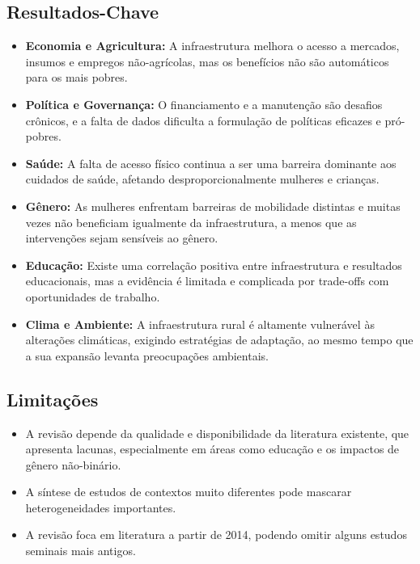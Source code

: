 \documentclass[12pt]{article}
\begin{document}
\subsection*{Resultados-Chave}
\begin{itemize}
    \item \textbf{Economia e Agricultura:} A infraestrutura melhora o acesso a mercados, insumos e empregos não-agrícolas, mas os benefícios não são automáticos para os mais pobres.
    \item \textbf{Política e Governança:} O financiamento e a manutenção são desafios crônicos, e a falta de dados dificulta a formulação de políticas eficazes e pró-pobres.
    \item \textbf{Saúde:} A falta de acesso físico continua a ser uma barreira dominante aos cuidados de saúde, afetando desproporcionalmente mulheres e crianças.
    \item \textbf{Gênero:} As mulheres enfrentam barreiras de mobilidade distintas e muitas vezes não beneficiam igualmente da infraestrutura, a menos que as intervenções sejam sensíveis ao gênero.
    \item \textbf{Educação:} Existe uma correlação positiva entre infraestrutura e resultados educacionais, mas a evidência é limitada e complicada por trade-offs com oportunidades de trabalho.
    \item \textbf{Clima e Ambiente:} A infraestrutura rural é altamente vulnerável às alterações climáticas, exigindo estratégias de adaptação, ao mesmo tempo que a sua expansão levanta preocupações ambientais.
\end{itemize}

\subsection*{Limitações}
\begin{itemize}
    \item A revisão depende da qualidade e disponibilidade da literatura existente, que apresenta lacunas, especialmente em áreas como educação e os impactos de gênero não-binário.
    \item A síntese de estudos de contextos muito diferentes pode mascarar heterogeneidades importantes.
    \item A revisão foca em literatura a partir de 2014, podendo omitir alguns estudos seminais mais antigos.
\end{itemize}
\end{document}
